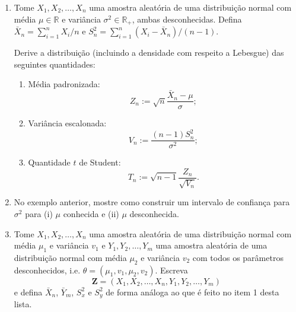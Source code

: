 \documentclass[a4paper,10pt, notitlepage]{report}
\newcommand{\rs}{X_1, X_2, \ldots, X_n} %
\begin{document}
\begin{enumerate} 
\item Tome $\rs$ uma amostra aleatória de uma distribuição normal com média $\mu \in \mathbb{R}$ e variância $\sigma^2 \in \mathbb{R}_+$, ambas desconhecidas.
Defina $\bar{X}_n = \sum_{i=1}^n X_i/n$ e $S_n^2 = \sum_{i=1}^n (X_i -\bar{X}_n )/(n-1)$.

Derive a distribuição (incluindo a densidade com respeito a Lebesgue) das seguintes quantidades:
\begin{enumerate}
    \item Média padronizada:
    \begin{equation*}
        Z_n  := \sqrt{n}\frac{\bar{X}_n - \mu}{\sigma};
    \end{equation*}
    \item Variância escalonada:
    \begin{equation*}
        V_n := \frac{(n-1)S_n^2}{\sigma^2};
    \end{equation*}
    \item Quantidade $t$ de Student:
    \begin{equation*}
        T_n := \sqrt{n-1}\frac{Z_n}{\sqrt{V_n}}.
    \end{equation*}
\end{enumerate}
\item No exemplo anterior, mostre como construir um intervalo de confiança para $\sigma^2$ para (i) $\mu$ conhecida e (ii) $\mu$ desconhecida.
\item Tome $\rs$ uma amostra aleatória de uma distribuição normal com média $\mu_1$ e variância $v_1$ e $Y_1, Y_2, \ldots, Y_m$ uma amostra aleatória de uma distribuição normal com média $\mu_2$ e variância $v_2$ com todos os parâmetros desconhecidos, i.e. $\theta = (\mu_1, v_1, \mu_2, v_2)$.
Escreva $$\boldsymbol{Z} = (\rs,  Y_1, Y_2, \ldots, Y_m)$$ e defina $\bar{X}_n$, $\bar{Y}_m$, $S_x^2$ e $S_y^2$ de forma análoga ao que é feito no item 1 desta lista.


\end{enumerate}
\end{document}
